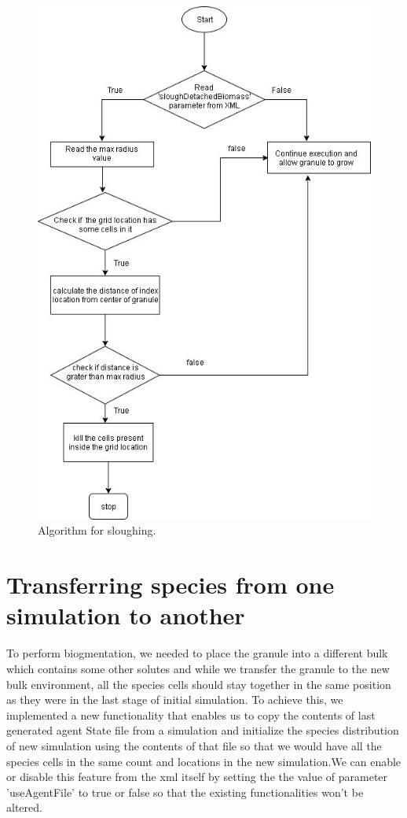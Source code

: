 \begin{figure}[htbp]
\centering
\includegraphics[width=1.0\textwidth]{images/sloughingalgo.jpg}
\caption{Algorithm for sloughing.}
\label{fig:sloughingalgo}
\end{figure}
\section{Transferring species from one simulation to another}

To perform biogmentation, we needed to place the granule into a different bulk which contains some other solutes and while we transfer the granule to the new bulk environment,  all the species cells should stay together in the same position as they were in the last stage of initial simulation. To achieve this, we implemented a new functionality that enables us to copy the contents of last generated agent State file from a simulation and initialize the species distribution of new simulation using the contents of that file so that we would have all the species cells in the same count and locations in the new simulation.We can enable or disable this feature from the xml itself by setting the the value of parameter 'useAgentFile' to true or false so that the existing functionalities won't be altered.

